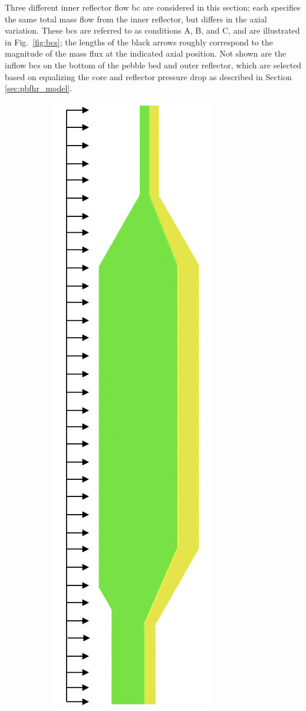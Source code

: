 Three different inner reflector flow \gls{bc} are considered in this section; each specifies the same total mass flow from the inner reflector, but differs in the axial variation. These \glspl{bc} are referred to as conditions A, B, and C, and are illustrated in Fig.\ \ref{fig:bcs}; the lengths of the black arrows roughly correspond to the magnitude of the mass flux at the indicated axial position. Not shown are the inflow \glspl{bc} on the bottom of the pebble bed and outer reflector, which are selected based on equalizing the core and reflector pressure drop as described in Section \ref{sec:pbfhr_model}.

\begin{figure}[!htb]
\centering
\begin{subfigure}{.32\textwidth}
  \centering
  \includegraphics[height=1.5\linewidth]{figs/bc_A.png}

\end{subfigure}
\end{figure}
